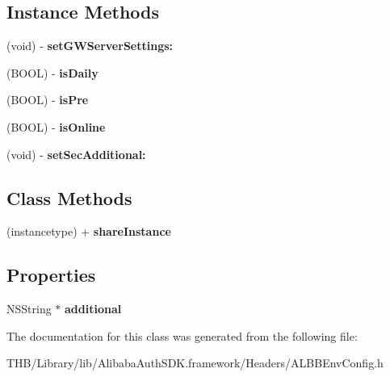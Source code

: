 \subsection*{Instance Methods}
\begin{DoxyCompactItemize}
\item 
\mbox{\label{interface_a_l_b_b_env_config_a17f28566be9582be22d97d6bf028fbe1}} 
(void) -\/ {\bfseries set\+G\+W\+Server\+Settings\+:}
\item 
\mbox{\label{interface_a_l_b_b_env_config_a5c7f3b9390473a6d1cb80f1eda68d9d8}} 
(B\+O\+OL) -\/ {\bfseries is\+Daily}
\item 
\mbox{\label{interface_a_l_b_b_env_config_a4360bd34e9080cf3b3858866e82f5470}} 
(B\+O\+OL) -\/ {\bfseries is\+Pre}
\item 
\mbox{\label{interface_a_l_b_b_env_config_aafca0b5cf45668966df802f6938d9a34}} 
(B\+O\+OL) -\/ {\bfseries is\+Online}
\item 
\mbox{\label{interface_a_l_b_b_env_config_a9fafad2ee8bd57db5f71fca9606716e5}} 
(void) -\/ {\bfseries set\+Sec\+Additional\+:}
\end{DoxyCompactItemize}
\subsection*{Class Methods}
\begin{DoxyCompactItemize}
\item 
\mbox{\label{interface_a_l_b_b_env_config_adff625dc235c555d0b47740879e7224f}} 
(instancetype) + {\bfseries share\+Instance}
\end{DoxyCompactItemize}
\subsection*{Properties}
\begin{DoxyCompactItemize}
\item 
\mbox{\label{interface_a_l_b_b_env_config_a6aa9171e3c45cf06b0fd2eb5bf2ad3fa}} 
N\+S\+String $\ast$ {\bfseries additional}
\end{DoxyCompactItemize}


The documentation for this class was generated from the following file\+:\begin{DoxyCompactItemize}
\item 
T\+H\+B/\+Library/lib/\+Alibaba\+Auth\+S\+D\+K.\+framework/\+Headers/A\+L\+B\+B\+Env\+Config.\+h\end{DoxyCompactItemize}
